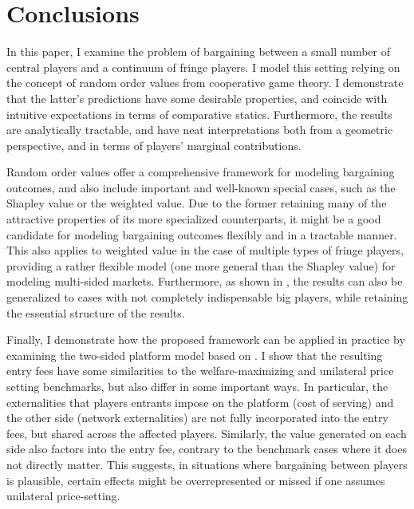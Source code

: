 \documentclass[a4paper]{article}
\begin{document}
\section{Conclusions}
\label{sec:conclusions}

In this paper, I examine the problem of bargaining between a small number of central players and a continuum of fringe players.
I model this setting relying on the concept of random order values from cooperative game theory.
I demonstrate that the latter's predictions have some desirable properties, and coincide with intuitive expectations in terms of comparative statics.
Furthermore, the results are analytically tractable, and have neat interpretations both from a geometric perspective, and in terms of players' marginal contributions.

Random order values offer a comprehensive framework for modeling bargaining outcomes, and also include important and well-known special cases, such as the Shapley value or the weighted value.
Due to the former retaining many of the attractive properties of its more specialized counterparts, it might be a good candidate for modeling bargaining outcomes flexibly and in a tractable manner.
This also applies to weighted value in the case of multiple types of fringe players, providing a rather flexible model (one more general than the Shapley value) for modeling multi-sided markets.
Furthermore, as shown in , the results can also be generalized to cases with not completely indispensable big players, while retaining the essential structure of the results.

Finally, I demonstrate how the proposed framework can be applied in practice by
examining the two-sided platform model based on \textcite{armstrong2006competition}.
I show that the resulting entry fees have some similarities to the welfare-maximizing and unilateral price setting benchmarks, but also differ in some important ways.
In particular, the externalities that players entrants impose on the platform (cost of serving) and the other side (network externalities) are not fully incorporated into the entry fees, but shared across the affected players.
Similarly, the value generated on each side also factors into the entry fee, contrary to the benchmark cases where it does not directly matter.
This suggests, in situations where bargaining between players is plausible, certain effects might be overrepresented or missed if one assumes unilateral price-setting.
\end{document}
